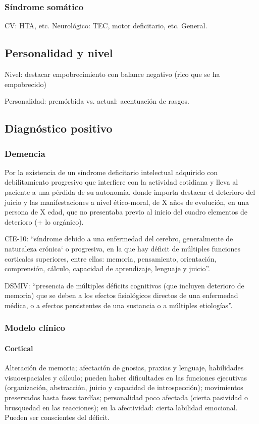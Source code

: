 \documentclass{scrbook}
\begin{document}
\subsubsection*{Síndrome somático}
CV: HTA, etc. Neurológico: TEC, motor deficitario, etc. General.
\subsection*{Personalidad y nivel}
Nivel: destacar empobrecimiento con balance negativo (rico que se ha empobrecido)

Personalidad: premórbida vs. actual: acentuación de rasgos.

\subsection*{Diagnóstico positivo}
\subsubsection*{Demencia}
Por la existencia de un síndrome deficitario intelectual adquirido con debilitamiento progresivo que interfiere con la actividad cotidiana y lleva al paciente a una pérdida de su autonomía, donde importa destacar el deterioro del juicio y las manifestaciones a nivel ético-moral, de X años de evolución, en una persona de X edad, que no presentaba previo al inicio del cuadro elementos de deterioro (+ lo orgánico).

CIE-10: “síndrome debido a una enfermedad del cerebro, generalmente de naturaleza crónica` o progresiva, en la que hay déficit de múltiples funciones corticales superiores, entre ellas: memoria, pensamiento, orientación, comprensión, cálculo, capacidad de aprendizaje, lenguaje y juicio”.

DSMIV: “presencia de múltiples déficits cognitivos (que incluyen deterioro de memoria) que se deben a los efectos fisiológicos directos de una enfermedad médica, o a efectos persistentes de una sustancia o a múltiples etiologías”.
\subsubsection*{Modelo clínico}
\paragraph{Cortical} Alteración de memoria; afectación de gnosias, praxias y lenguaje, habilidades visuoespaciales y cálculo; pueden haber dificultades en las funciones ejecutivas (organización, abstracción, juicio y capacidad de introspección); movimientos preservados hasta fases tardías; personalidad poco afectada (cierta pasividad o brusquedad en las reacciones); en la afectividad: cierta labilidad emocional. Pueden ser conscientes del déficit.
\end{document}
